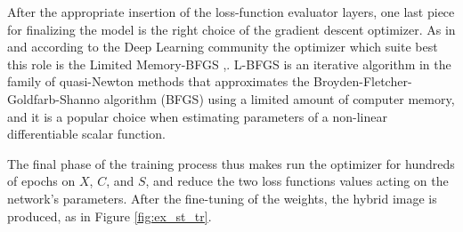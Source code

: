 After the appropriate insertion of the loss-function evaluator layers, one last piece for finalizing the model is the right choice of the gradient descent optimizer. As in \cite{1508.06576} and according to the Deep Learning community the optimizer which suite best this role is the Limited Memory-BFGS \cite{10.1093/imamat/6.1.76},\cite{shanno1970conditioning}. L-BFGS is an iterative algorithm in the family of quasi-Newton methods that approximates the Broyden-Fletcher-Goldfarb-Shanno algorithm (BFGS) using a limited amount of computer memory, and it is a popular choice when estimating parameters of a non-linear differentiable scalar function.

The final phase of the training process thus makes run the optimizer for hundreds of epochs on $X$, $C$, and $S$, and reduce the two loss functions values acting on the network's parameters. After the fine-tuning of the weights, the hybrid image is produced, as in Figure \ref{fig:ex_st_tr}.

\clearpage
